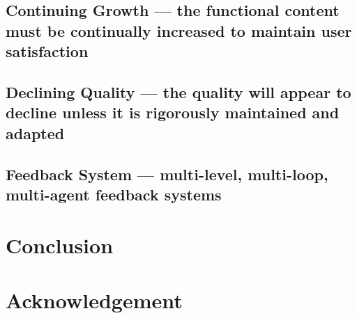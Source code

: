 \documentclass[conference]{IEEEtran}
\begin{document}
\subsection{Continuing Growth — the functional content must be continually increased to maintain user satisfaction}

\subsection{Declining Quality — the quality will appear to decline unless it is rigorously maintained and adapted}

\subsection{Feedback System — multi-level, multi-loop, multi-agent feedback systems}





\section{Conclusion} \label{conclusion}


\section*{Acknowledgement} \label{acknowledgement}




\end{document}
